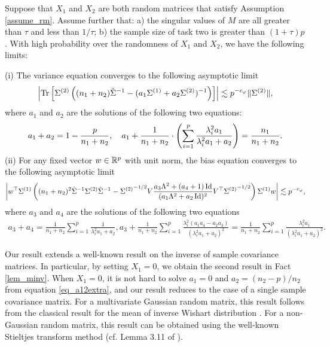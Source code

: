 \begin{theorem}\label{thm_main_RMT}
	Suppose that $X_1$ and $X_2$ are both random matrices that satisfy Assumption \ref{assume_rm}.
	Assume further that: a) the singular values of $M$ are all greater than $\tau$ and less than $1/\tau$; b) the sample size of task two is greater than $(1 + \tau) p$.
	With high probability over the randomness of $X_1$ and $X_2$, we have the following limits:

	\noindent (i) The variance equation converges to the following asymptotic limit
			\begin{align}\label{lem_cov_shift_eq}
				{\left| {\operatorname{Tr}\left[\Sigma^{(2)} \left({(n_1 + n_2){\hat{\Sigma}^{-1}} - (a_1 \Sigma^{(1)} + a_2 \Sigma^{(2)})^{-1}}\right)\right]} \right|} \lesssim p^{-c_{\varphi}}\|\Sigma^{(2)}\|,
			\end{align}
			where $a_1$ and $a_2$ are the solutions of the following two equations:
			\begin{align}
				a_1 + a_2 = 1- \frac{p}{n_1 + n_2},\quad a_1 + \frac1{n_1 + n_2}\cdot \left({\sum_{i=1}^p \frac{\lambda_i^2 a_1}{\lambda_i^2 a_1 + a_2}}\right) = \frac{n_1}{n_1 + n_2}. \label{eq_a12extra}
			\end{align}
	\noindent (ii) For any fixed vector $w\in\mathbb{R}^p$ with unit norm, the bias equation converges to the following asymptotic limit
			\begin{align}\label{lem_cov_derv_eq}
				{\left| {w^{\top} \Sigma^{(1)} \left({(n_1+n_2)^2\hat{\Sigma}^{-1} \Sigma^{(2)} \hat{\Sigma}^{-1} - {\Sigma^{(2)}}^{-1/2} V {\frac{a_3 \Lambda^2 + (a_4 + 1)\operatorname{Id}}{(a_1 \Lambda^2 + a_2\operatorname{Id})^2}} V^{\top} {\Sigma^{(2)}}^{-1/2}}\right) \Sigma^{(1)} w} \right|} \lesssim p^{-c_{\varphi}},
			\end{align}
				where $a_{3}$ and $a_4$ are the solutions of the following two equations %
			\begin{align}\label{eq_a34extra}
				a_3 + a_4 = \frac{1}{n_1 + n_2}\sum_{i=1}^p \frac{1}{\lambda_i^2 a_1 + a_2},
				a_3 + \frac{1}{n_1 + n_2} \sum_{i=1}^p \frac{\lambda_i^2 (a_1 a_4 - a_2 a_3)}{(\lambda_i^2 a_1 + a_2)^2} = \frac{1}{n_1 + n_2} \sum_{i=1}^p \frac{\lambda_i^2 a_1}{(\lambda_i^2 a_1 + a_2)^{2}}.
			\end{align}
\end{theorem}
Our result extends a well-known result on the inverse of sample covariance matrices.
In particular, by setting $X_1 = 0$, we obtain the second result in Fact \ref{lem_minv}.
When $X_1=0$, it is not hard to solve $a_1 = 0$ and $a_2 = (n_2-p) / n_2$ from equation \eqref{eq_a12extra}, and our result reduces to the case of a single sample covariance matrix.
For a multivariate Gaussian random matrix, this result follows from the classical result for the mean of inverse Wishart distribution \cite{anderson1958introduction}.
For a non-Gaussian random matrix, this result can be obtained using the well-known Stieltjes transform method (cf. Lemma 3.11 of \citet{bai2009spectral}).

